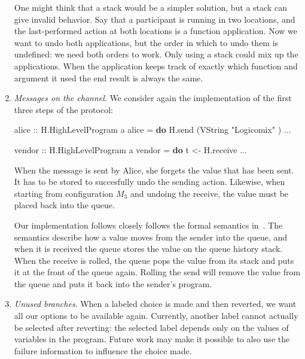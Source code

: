 \documentclass[runningheads,plain]{llncs}
\newenvironment{Shaded}{}{}
\newcommand{\KeywordTok}[1]{\textcolor[rgb]{0.00,0.44,0.13}{\textbf{#1}}}
\newcommand{\DataTypeTok}[1]{\textcolor[rgb]{0.56,0.13,0.00}{#1}}
\newcommand{\StringTok}[1]{\textcolor[rgb]{0.25,0.44,0.63}{#1}}
\newcommand{\OtherTok}[1]{\textcolor[rgb]{0.00,0.44,0.13}{#1}}
\newcommand{\FunctionTok}[1]{\textcolor[rgb]{0.02,0.16,0.49}{#1}}
\newcommand{\NormalTok}[1]{#1}
\begin{document}
\begin{enumerate}
  One might think that a stack would be a simpler solution, but a stack
  can give invalid behavior. Say that a participant is running in two
  locations, and the last-performed action at both locations is a
  function application. Now we want to undo both applications, but the
  order in which to undo them is undefined: we need both orders to work.
  Only using a stack could mix up the applications. When the application
  keeps track of exactly which function and argument it used the end
  result is always the same.  \\
  
\item \emph{Messages on the channel}.
    We consider again the implementation of the first three steps of the protocol:

\begin{Shaded}
\begin{Highlighting}[]
\OtherTok{alice ::} \DataTypeTok{H.HighLevelProgram}\NormalTok{ a}
\NormalTok{alice }\FunctionTok{=} \KeywordTok{do} 
\NormalTok{    H.send (}\DataTypeTok{VString} \StringTok{"Logicomix"}\NormalTok{ )}
    \FunctionTok{...}

\OtherTok{vendor ::} \DataTypeTok{H.HighLevelProgram}\NormalTok{ a}
\NormalTok{vendor }\FunctionTok{=} \KeywordTok{do} 
\NormalTok{    t }\OtherTok{<-}\NormalTok{ H.receive }
    \FunctionTok{...}
\end{Highlighting}
\end{Shaded}

  When the message is sent by Alice, she forgets the value that has been
  sent. It has to be stored to succesfully undo the sending action.
  Likewise, when starting from configuration $M_3$ and undoing the receive,
  the value must be placed back into the queue. 

  Our implementation follows closely follows the formal semantics in~\cite{DBLP:conf/ppdp/MezzinaP17}. 
  The semantics describe how a value moves from the sender into the
  queue, and when it is received the queue stores the value on the queue
  history stack. When the receive is rolled, the queue pops the value
  from its stack and puts it at the front of the queue again. Rolling
  the send will remove the value from the queue and puts it back into
  the sender's program. \\
\item \emph{Unused branches}.
  When a labeled choice is made and then reverted, we want all our options to be
  available again. Currently, another label cannot actually be selected
  after reverting: the selected label depends only on the values of
  variables in the program. Future work may make it possible to also use
  the failure information to influence the choice made.
  

\end{enumerate}
\end{document}
